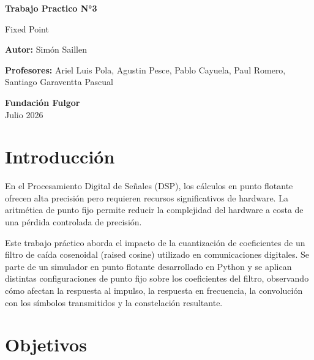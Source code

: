 \documentclass[11pt,a4paper]{article}
\begin{document}
\begin{titlepage}
    \begin{center}
        \vspace*{1cm}

        \Huge
        \textbf{Trabajo Practico N°3}

        \vspace{0.5cm}
        \LARGE
        Fixed Point

        \vspace{1.5cm}

        \vfill

        \Large
        \textbf{Autor:} Simón Saillen

        \Large
        \textbf{Profesores:} Ariel Luis Pola, Agustin Pesce, Pablo Cayuela, Paul Romero, Santiago Garaventta Pascual

        \vspace{0.5cm}

        \Large
        \textbf{Fundación Fulgor}\\
        Julio 2026

    \end{center}
\end{titlepage}
\newpage

\section{Introducción}

En el Procesamiento Digital de Señales (DSP), los cálculos en punto flotante
ofrecen alta precisión pero requieren recursos significativos de hardware. La
aritmética de punto fijo permite reducir la complejidad del hardware a costa de
una pérdida controlada de precisión.

Este trabajo práctico aborda el impacto de la cuantización de coeficientes de
un filtro de caída cosenoidal (raised cosine) utilizado en comunicaciones
digitales. Se parte de un simulador en punto flotante desarrollado en Python y
se aplican distintas configuraciones de punto fijo sobre los coeficientes del
filtro, observando cómo afectan la respuesta al impulso, la respuesta en
frecuencia, la convolución con los símbolos transmitidos y la constelación
resultante.

\section{Objetivos}
\end{document}
